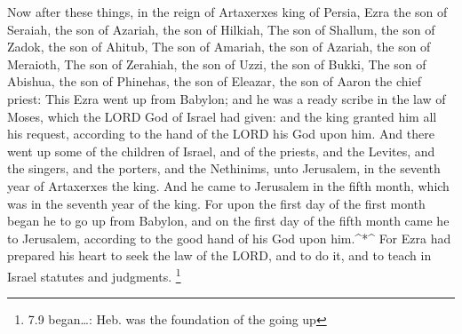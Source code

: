  Now after these things, in the reign of Artaxerxes king of
Persia, Ezra the son of Seraiah, the son of Azariah, the son of Hilkiah,
 The son of Shallum, the son of Zadok, the son of Ahitub,
 The son of Amariah, the son of Azariah, the son of
Meraioth,  The son of Zerahiah, the son of Uzzi, the son of
Bukki,  The son of Abishua, the son of Phinehas, the son of
Eleazar, the son of Aaron the chief priest:  This Ezra went
up from Babylon; and he was a ready scribe in the law of Moses, which
the LORD God of Israel had given: and the king granted him all his
request, according to the hand of the LORD his God upon him.
 And there went up some of the children of Israel, and of
the priests, and the Levites, and the singers, and the porters, and the
Nethinims, unto Jerusalem, in the seventh year of Artaxerxes the king.
 And he came to Jerusalem in the fifth month, which was in
the seventh year of the king.  For upon the first day of the
first month began he to go up from Babylon, and on the first day of the
fifth month came he to Jerusalem, according to the good hand of his God
upon him.\^{}*\^{}  For Ezra had prepared his heart to seek
the law of the LORD, and to do it, and to teach in Israel statutes and
judgments. \footnote{7.9 began\ldots: Heb. was the foundation of the
  going up}

